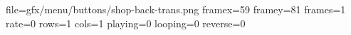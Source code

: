 file=gfx/menu/buttons/shop-back-trans.png
framex=59
framey=81
frames=1
rate=0
rows=1
cols=1
playing=0
looping=0
reverse=0